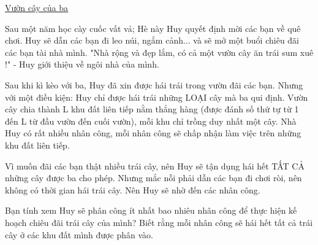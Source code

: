 \href{https://www.youtube.com/watch?v=WBJMeGgAmY8}{Vườn cây của ba }

Sau một năm học cày cuốc vất vả; Hè này Huy quyết định mời các bạn về quê chơi. Huy sẽ dẫn các bạn đi leo núi, ngắm cảnh... và sẽ mở một buổi chiêu đãi các bạn tài nhà mình. "Nhà rộng và đẹp lắm, có cả một vườn cây ăn trái sum xuê !" - Huy giới thiệu về ngôi nhà của mình.

Sau khi kì kèo với ba, Huy đã xin được hái trái trong vườn đãi các bạn. Nhưng với một điều kiện: Huy chỉ được hái trái những LOẠI cây mà ba qui định. Vườn cây chia thành L khu đất liên tiếp nằm thẳng hàng (được đánh số thứ tự từ 1 đến L từ đầu vườn đến cuối vườn), mỗi khu chỉ trồng duy nhất một cây. Nhà Huy có rất nhiều nhân công, mỗi nhân công sẽ chấp nhận làm việc trên những khu đất liên tiếp.

Vì muốn đãi các bạn thật nhiều trái cây, nên Huy sẽ tận dụng hái hết TẤT CẢ những cây được ba cho phép. Nhưng mắc nỗi phải dẫn các bạn đi chơi ròi, nên không có thời gian hái trái cây. Nên Huy sẽ nhờ đến các nhân công.

Bạn tính xem Huy sẽ phân công ít nhất bao nhiêu nhân công để thực hiện kế hoạch chiêu đãi trái cây của mình? Biết rằng mỗi nhân công sẽ hái hết tất cả trái cây ở các khu đất mình được phân vào.